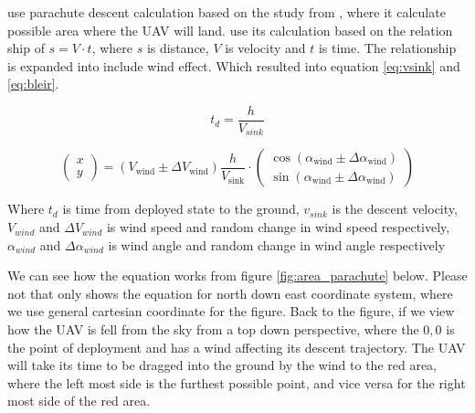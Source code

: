 \documentclass[12pt]{report}
\begin{document}
            \cite{primatesta_ground_2020} use parachute descent calculation based on the study from
            \cite{bleier_risk_2015}, where it calculate possible area where the UAV will land. \cite{bleier_risk_2015}
            use its calculation based on the relation ship of \(s = V \cdot t\), where \(s\) is distance, \(V\) is
            velocity and \(t\) is time. The relationship is expanded into include wind effect. Which resulted into
            equation \ref{eq:vsink} and \ref{eq:bleir}.

            \begin{equation}\label{eq:vsink}
                t_d = \frac{h} {V_{sink}}
            \end{equation}

            \begin{equation}\label{eq:bleir}
                \begin{pmatrix}
                    x \\
                    y
                \end{pmatrix}
                =
                \left( V_{\text{wind}} \pm \Delta V_{\text{wind}} \right) \frac{h}{V_{\text{sink}}}
                \cdot
                \begin{pmatrix}
                    \cos \left( \alpha_{\text{wind}} \pm \Delta \alpha_{\text{wind}} \right) \\
                    \sin \left( \alpha_{\text{wind}} \pm \Delta \alpha_{\text{wind}} \right)
                \end{pmatrix}
            \end{equation}

            Where \(t_d\) is time from deployed state to the ground, \(v_{sink}\) is the descent velocity,
            \(V_{wind}\) and \(\Delta V_{wind}\) is wind speed and random change in wind speed respectively,
            \(\alpha_{wind}\) and \(\Delta \alpha_{wind}\) is wind angle and random change in wind angle respectively

            We can see how the equation works from figure \ref{fig:area_parachute} below. Please not that
            \cite{bleier_risk_2015} only shows the equation for north down east coordinate system, where we use general
            cartesian coordinate for the figure. Back to the figure, if we view how the UAV is fell from the sky from a
            top down perspective, where the \(0,0\) is the point of deployment and has a wind affecting its descent
            trajectory. The UAV will take its time to be dragged into the ground by the wind to the red area, where the
            left most side is the furthest possible point, and vice versa for the right most side of the red area. 
\end{document}
